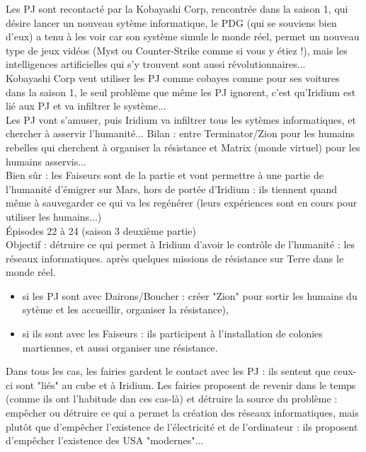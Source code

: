 \documentclass[11pt,twoside,a4paper]{book}
\begin{document}
Les PJ sont recontact{\'e} par la Kobayashi Corp, rencontr{\'e}e dans la saison 1, qui d{\'e}sire lancer un nouveau syt{\`e}me informatique, le PDG (qui se souviens bien d'eux) a tenu {\`a} les voir car son syst{\`e}me simule le monde r{\'e}el, permet un nouveau type de jeux vid{\'e}os (Myst ou Counter-Strike comme si vous y {\'e}tiez !), mais les intelligences artificielles qui s'y trouvent sont aussi r{\'e}volutionnaires... ~\\
Kobayashi Corp veut utiliser les PJ comme cobayes comme pour ses voitures dans la saison 1, le seul probl{\`e}me que m{\^e}me les PJ ignorent, c'est qu'Iridium est li{\'e} aux PJ et va infiltrer le syst{\`e}me... ~\\
Les PJ vont s'amuser, puis Iridium va infiltrer tous les syt{\`e}mes informatiques, et chercher {\`a} asservir l'humanit{\'e}... Bilan : entre Terminator/Zion pour les humains rebelles qui cherchent {\`a} organiser la r{\'e}sistance et Matrix (monde virtuel) pour les humains asservis... ~\\
Bien s{\^u}r : les Faiseurs sont de la partie et vont permettre {\`a} une partie de l'humanit{\'e} d'{\'e}migrer sur Mars, hors de port{\'e}e d'Iridium : ils tiennent quand m{\^e}me {\`a} sauvegarder ce qui va les reg{\'e}n{\'e}rer (leurs exp{\'e}riences sont en cours pour utiliser les humains...) ~\\


{\'E}pisodes 22 {\`a} 24 (saison 3 deuxi{\`e}me partie) ~\\
Objectif : d{\'e}truire ce qui permet {\`a} Iridium d'avoir le contr{\^o}le de l'humanit{\'e} : les r{\'e}seaux informatiques. apr{\`e}s quelques missions de r{\'e}sistance sur Terre dans le monde r{\'e}el. ~\\
\begin{itemize}
	\item si les PJ sont avec Dairons/Boucher : cr{\'e}er "Zion" pour sortir les humains du syt{\`e}me et les accueillir, organiser la r{\'e}sistance), 
	\item si ils sont avec les Faiseurs : ils participent {\`a} l'installation de colonies martiennes, et aussi organiser une r{\'e}sistance. 
\end{itemize}
Dans tous les cas, les fairies gardent le contact avec les PJ : ils sentent que ceux-ci sont "li{\'e}s" au cube et {\`a} Iridium. Les fairies proposent de revenir dans le temps (comme ils ont l'habitude dan ces cas-l{\`a}) et d{\'e}truire la source du probl{\`e}me : emp{\^e}cher ou d{\'e}truire ce qui a permet la cr{\'e}ation des r{\'e}seaux informatiques, mais plut{\^o}t que d'emp{\^e}cher l'existence de l'{\'e}lectricit{\'e} et de l'ordinateur : ils proposent d'emp{\^e}cher l'existence des USA "modernes"... ~\\
\end{document}
